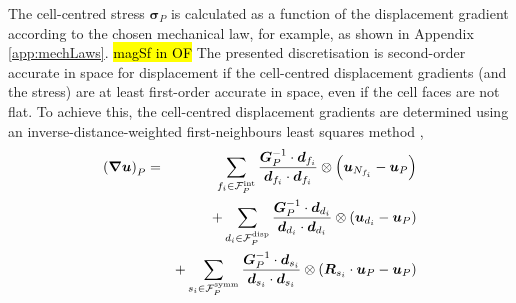 \documentclass[sn-mathphys,Numbered]{sn-jnl}%
\newcommand{\bb}{\boldsymbol}
\begin{document}
The cell-centred stress $\bb{\sigma}_P$ is calculated as a function of the displacement gradient according to the chosen mechanical law, for example, as shown in Appendix \ref{app:mechLaws}.
\hl{magSf in OF}
The presented discretisation is second-order accurate in space for displacement if the cell-centred displacement gradients (and the stress) are at least first-order accurate in space, even if the cell faces are not flat.
To achieve this, the cell-centred displacement gradients are determined using an inverse-distance-weighted first-neighbours least squares method \citep{Jasak1996},
\begin{eqnarray} \label{eq:leastSquaresGrad}
	\left(\bb{\nabla}\bb{u}\right)_P
		&=&\sum_{f_i \in \mathcal{F}^{\text{int}}_P} \frac{\bb{G}^{-1}_P \cdot \bb{d}_{f_i}}{\bb{d}_{f_i} \cdot \bb{d}_{f_i}}  \otimes \left(\bb{u}_{N_{f_i}} - \bb{u}_P \right) \notag \\
		&&+ \sum_{d_i \in \mathcal{F}^{\text{disp}}_P} \frac{ \bb{G}^{-1}_P \cdot \bb{d}_{d_i} }{\bb{d}_{d_i} \cdot \bb{d}_{d_i}} \otimes \left(\bb{u}_{d_i} - \bb{u}_P \right) \notag \\
		&&+ \sum_{s_i \in \mathcal{F}^{\text{symm}}_P} \frac{\bb{G}^{-1}_P \cdot \bb{d}_{s_i}}{\bb{d}_{s_i} \cdot \bb{d}_{s_i}} \otimes \left(\bb{R}_{s_i} \cdot \bb{u}_P - \bb{u}_P \right)
\end{eqnarray}
\end{document}
